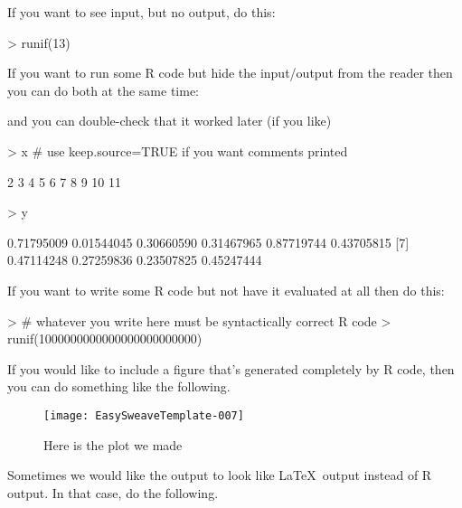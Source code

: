 \documentclass[12pt]{article}         %
\begin{document}
If you want to see input, but no output, do this:

\begin{Schunk}
\begin{Sinput}
> runif(13)
\end{Sinput}
\end{Schunk}

If you want to run some \textsf{R} code but hide the input/output from the reader then you can do both at the same time:


\bigskip   %

and you can double-check that it worked later (if you like)

\begin{Schunk}
\begin{Sinput}
> x  # use keep.source=TRUE if you want comments printed
\end{Sinput}
\begin{Soutput}
 [1]  2  3  4  5  6  7  8  9 10 11
\end{Soutput}
\begin{Sinput}
> y
\end{Sinput}
\begin{Soutput}
 [1] 0.71795009 0.01544045 0.30660590 0.31467965 0.87719744 0.43705815
 [7] 0.47114248 0.27259836 0.23507825 0.45247444
\end{Soutput}
\end{Schunk}

If you want to write some \textsf{R} code but not have it evaluated at all then do this:

\begin{Schunk}
\begin{Sinput}
> # whatever you write here must be syntactically correct R code
> runif(1000000000000000000000000)
\end{Sinput}
\end{Schunk}

If you would like to include a figure that's generated completely by \textsf{R} code, then you can do something like the following.

\begin{figure}
\texttt{[image: EasySweaveTemplate-007]}
\caption{Here is the plot we made}
\end{figure}


Sometimes we would like the output to look like \LaTeX\ output instead of \textsf{R} output.  In that case, do the following.
\end{document}
